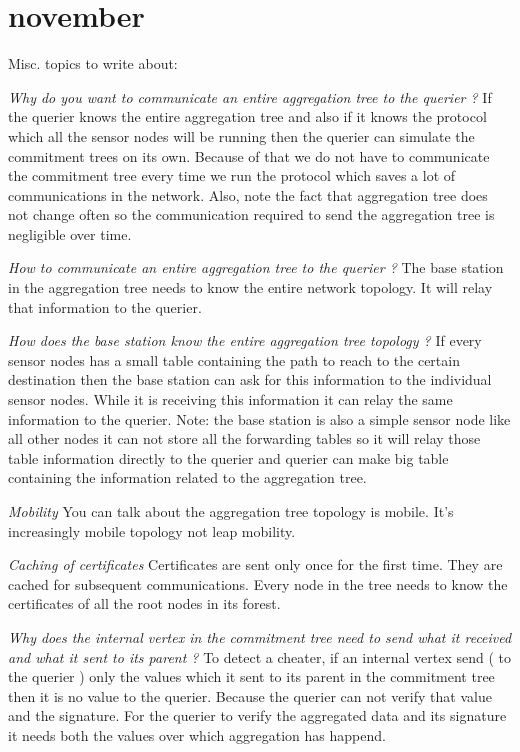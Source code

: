 \chapter{november}

Misc. topics to write about:

\textit{Why do you want to communicate an entire aggregation tree to the querier ?}
	If the querier knows the entire aggregation tree and also if it knows the protocol which all the sensor nodes will be running then the querier can simulate the commitment trees on its own. Because of that we do not have to communicate the commitment tree every time we run the protocol which saves a lot of communications in the network. Also, note the fact that aggregation tree does not change often so the communication required to send the aggregation tree is negligible over time.

\textit{How to communicate an entire aggregation tree to the querier ?}
	The base station in the aggregation tree needs to know the entire network topology.
	It will relay that information to the querier.

\textit{How does the base station know the entire aggregation tree topology ?}
	If every sensor nodes has a small table containing the path to reach to the certain destination then the base station can ask for this information to the individual sensor nodes. While it is receiving this information it can relay the same information to the querier. Note: the base station is also a simple sensor node like all other nodes it can not store all the forwarding tables so it will relay those table information directly to the querier and querier can make big table containing the information related to the aggregation tree.

\textit{Mobility}
	You can talk about the aggregation tree topology is mobile. It's increasingly mobile topology not leap mobility.

\textit{Caching of certificates}
		Certificates are sent only once for the first time. They are cached for subsequent communications. Every node in the tree needs to know the certificates of all the root nodes in its forest.

\textit{Why does the internal vertex in the commitment tree need to send what it received and what it sent to its parent ?}
	To detect a cheater, if an internal vertex send ( to the querier ) only the values which it sent to its parent in the commitment tree then it is no value to the querier. Because the querier can not verify that value and the signature. For the querier to verify the aggregated data and its signature it needs both the values over which aggregation has happend. 

